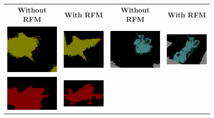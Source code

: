 \begin{figure}[H]
  \begin{tabular}{c c c c}
    \textbf{Without RFM} & \textbf{With RFM} & \hspace{4pt} \textbf{Without RFM} & \textbf{With RFM} \\
    [2pt]
    \includegraphics[width=0.18\linewidth, height=0.18\linewidth]{figures/ablation/withoutrfm/2008_001185_[2]} &
    \includegraphics[width=0.18\linewidth, height=0.18\linewidth]{figures/ablation/withrfm/2008_001185_[2]} & \hspace{2pt}
    \includegraphics[width=0.18\linewidth, height=0.18\linewidth]{figures/ablation/withoutrfm/2008_007558_[6, 13]} &
    \includegraphics[width=0.18\linewidth, height=0.18\linewidth]{figures/ablation/withrfm/2008_007558_[6, 13]} \\
    [1mm]
    \includegraphics[width=0.18\linewidth, height=0.18\linewidth]{figures/ablation/withoutrfm/2011_001753_[0]} &
    \includegraphics[width=0.18\linewidth, height=0.18\linewidth]{figures/ablation/withrfm/2011_001753_[0]} & \hspace{2pt}

\end{tabular}
\end{figure}
